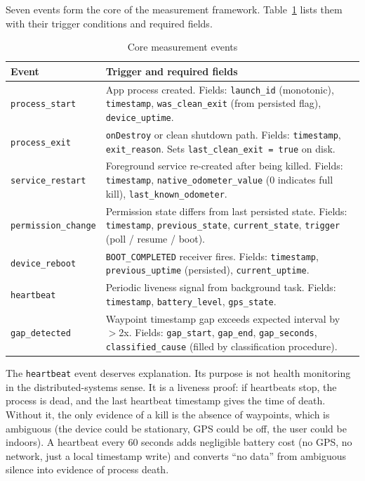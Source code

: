 \documentclass[10pt,journal,compsoc]{IEEEtran}
\begin{document}
Seven events form the core of the measurement framework.
Table~\ref{tab:events} lists them with their trigger conditions and
required fields.

\begin{table}[h]
\caption{Core measurement events}
\label{tab:events}
\small
\begin{tabular}{@{}p{2.8cm}p{5.5cm}@{}}
\toprule
Event & Trigger and required fields \\
\midrule
\texttt{process\_start} &
App process created. Fields: \texttt{launch\_id} (monotonic),
\texttt{timestamp}, \texttt{was\_clean\_exit} (from persisted flag),
\texttt{device\_uptime}. \\

\texttt{process\_exit} &
\texttt{onDestroy} or clean shutdown path. Fields: \texttt{timestamp},
\texttt{exit\_reason}. Sets \texttt{last\_clean\_exit = true}
on disk. \\

\texttt{service\_restart} &
Foreground service re-created after being killed. Fields:
\texttt{timestamp}, \texttt{native\_odometer\_value} (0 indicates
full kill), \texttt{last\_known\_odometer}. \\

\texttt{permission\_change} &
Permission state differs from last persisted state. Fields:
\texttt{timestamp}, \texttt{previous\_state},
\texttt{current\_state}, \texttt{trigger} (poll / resume / boot). \\

\texttt{device\_reboot} &
\texttt{BOOT\_COMPLETED} receiver fires. Fields: \texttt{timestamp},
\texttt{previous\_uptime} (persisted), \texttt{current\_uptime}. \\

\texttt{heartbeat} &
Periodic liveness signal from background task. Fields:
\texttt{timestamp}, \texttt{battery\_level}, \texttt{gps\_state}. \\

\texttt{gap\_detected} &
Waypoint timestamp gap exceeds expected interval by $>$2x. Fields:
\texttt{gap\_start}, \texttt{gap\_end}, \texttt{gap\_seconds},
\texttt{classified\_cause} (filled by classification procedure). \\

\bottomrule
\end{tabular}
\end{table}

The \texttt{heartbeat} event deserves explanation. Its purpose is not
health monitoring in the distributed-systems sense. It is a liveness
proof: if heartbeats stop, the process is dead, and the last heartbeat
timestamp gives the time of death. Without it, the only evidence of a
kill is the absence of waypoints, which is ambiguous (the device could
be stationary, GPS could be off, the user could be indoors). A heartbeat
every 60 seconds adds negligible battery cost (no GPS, no network, just
a local timestamp write) and converts ``no data'' from ambiguous silence
into evidence of process death.
\end{document}
